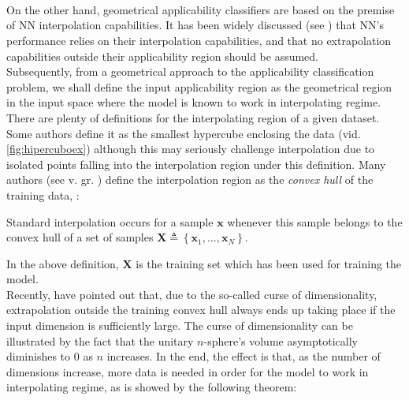\paragraph{ \\}
On the other hand, geometrical applicability classifiers are based on the premise of NN interpolation capabilities. It has been widely discussed (see \eg \cite{pmlr-v80-barrett18a,DBLP:journals/corr/abs-1711-00350,DBLP:journals/corr/abs-1904-01557}) that NN's performance relies on their interpolation capabilities, and that no extrapolation capabilities outside their applicability region should be assumed.\\
%
\indent Subsequently, from a geometrical approach to the applicability classification problem, we shall define the input applicability region as the geometrical region in the input space where the model is known to work in interpolating regime.\\
%
\indent There are plenty of definitions for the interpolating region of a given dataset. Some authors define it as the smallest hypercube enclosing the data\cite{ebert2014interpolation} (vid. \cref{fig:hipercuboex}) although this may seriously challenge interpolation due to isolated points falling into the interpolation region under this definition. Many authors (see v. gr. \cite{loh2007extrapolation,4505337}) define the interpolation region as the \textit{convex hull} of the training data, \ie:

\begin{definition}\cite{balestriero2021learning}\label{def:interpolacion}
	Standard interpolation occurs for a sample $\mathbf{x}$ whenever this sample belongs to the convex hull of a set of samples $\mathbf{X}\triangleq \left\{\mathbf{x}_1,...,\mathbf{x}_N\right\}$.
\end{definition}

In the above definition, $\mathbf{X}$ is the training set which has been used for training the model.\\
%
\indent Recently, \cite{balestriero2021learning} have pointed out that, due to the so-called curse of dimensionality, extrapolation outside the training convex hull always ends up taking place if the input dimension is sufficiently large. The curse of dimensionality\cite[pp. 17-18]{Marsland2015Machine} can be illustrated by the fact that the unitary $n$-sphere's volume asymptotically diminishes to $0$ as $n$ increases. In the end, the effect is that, as the number of dimensions increase, more data is needed in order for the model to work in interpolating regime, as is showed by the following theorem:\\

